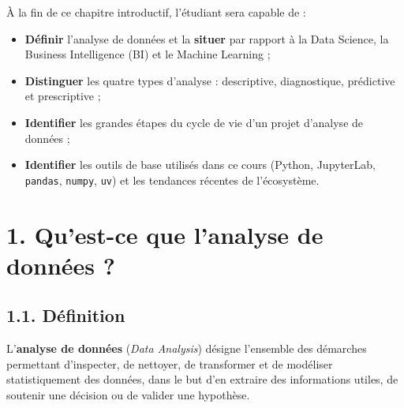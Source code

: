 \documentclass[
  french,
  letterpaper,
  open=any]{scrbook}
\providecommand{\tightlist}{%
  \setlength{\itemsep}{0pt}\setlength{\parskip}{0pt}}
\theoremstyle{definition}
\theoremstyle{definition}
\theoremstyle{remark}
\begin{document}
\begin{tcolorbox}[enhanced jigsaw, arc=.35mm, bottomrule=.15mm, bottomtitle=1mm, breakable, colback=white, colbacktitle=quarto-callout-tip-color!10!white, colframe=quarto-callout-tip-color-frame, coltitle=black, left=2mm, leftrule=.75mm, opacityback=0, opacitybacktitle=0.6, rightrule=.15mm, title=\textcolor{quarto-callout-tip-color}{\faLightbulb}\hspace{0.5em}{Objectifs du chapitre}, titlerule=0mm, toprule=.15mm, toptitle=1mm]

À la fin de ce chapitre introductif, l'étudiant sera capable de :

\begin{itemize}
\tightlist
\item
  \textbf{Définir} l'analyse de données et la \textbf{situer} par
  rapport à la Data Science, la Business Intelligence (BI) et le Machine
  Learning ;
\item
  \textbf{Distinguer} les quatre types d'analyse : descriptive,
  diagnostique, prédictive et prescriptive ;
\item
  \textbf{Identifier} les grandes étapes du cycle de vie d'un projet
  d'analyse de données ;
\item
  \textbf{Identifier} les outils de base utilisés dans ce cours (Python,
  JupyterLab, \texttt{pandas}, \texttt{numpy}, \texttt{uv}) et les
  tendances récentes de l'écosystème.
\end{itemize}

\end{tcolorbox}

\section{1. Qu'est-ce que l'analyse de données
?}\label{quest-ce-que-lanalyse-de-donnuxe9es}

\subsection{1.1. Définition}\label{duxe9finition}

L'\textbf{analyse de données} (\emph{Data Analysis}) désigne l'ensemble
des démarches permettant d'inspecter, de nettoyer, de transformer et de
modéliser statistiquement des données, dans le but d'en extraire des
informations utiles, de soutenir une décision ou de valider une
hypothèse.
\end{document}

